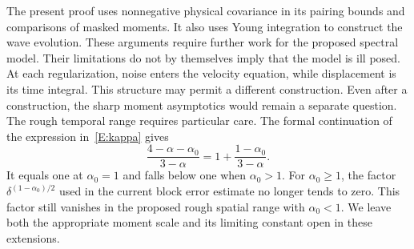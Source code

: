 The present proof uses nonnegative physical covariance in its pairing bounds
and comparisons of masked moments. It also uses Young integration to construct
the wave evolution. These arguments require further work for the proposed
spectral model. Their limitations do not by themselves imply that the model is
ill posed. At each regularization, noise enters the velocity equation, while
displacement is its time integral. This structure may permit a different
construction. Even after a construction, the sharp moment asymptotics would
remain a separate question. The rough temporal range requires particular
care. The formal continuation of the expression in~\eqref{E:kappa} gives
\[
  \frac{4-\alpha-\alpha_0}{3-\alpha}
  = 1+\frac{1-\alpha_0}{3-\alpha}.
\]
It equals one at $\alpha_0 = 1$ and falls below one when $\alpha_0 > 1$.
For $\alpha_0 \ge 1$, the factor $\delta^{(1-\alpha_0)/2}$ used in the
current block error estimate no longer tends to zero. This factor still
vanishes in the proposed rough spatial range with $\alpha_0 < 1$. We leave
both the appropriate moment scale and its limiting constant open in these
extensions.
